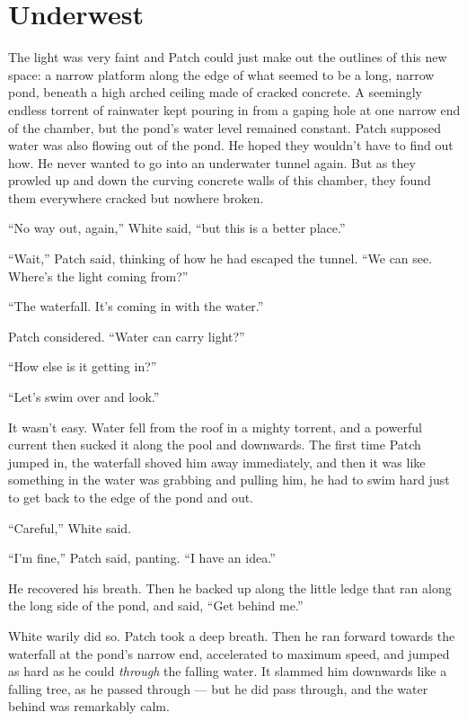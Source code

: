 \documentclass[12pt]{memoir}
\begin{document}

\section{Underwest}

The light was very faint and Patch could just make out the outlines of
this new space: a narrow platform along the edge of what seemed to be
a long, narrow pond, beneath a high arched ceiling made of cracked
concrete. A seemingly endless torrent of rainwater kept pouring in
from a gaping hole at one narrow end of the chamber, but the pond’s
water level remained constant. Patch supposed water was also flowing
out of the pond. He hoped they wouldn’t have to find out how. He never
wanted to go into an underwater tunnel again. But as they prowled up
and down the curving concrete walls of this chamber, they found them
everywhere cracked but nowhere broken.

“No way out, again,” White said, “but this is a better place.”

“Wait,” Patch said, thinking of how he had escaped the tunnel. “We can
see. Where’s the light coming from?”

“The waterfall. It’s coming in with the water.”

Patch considered. “Water can carry light?”

“How else is it getting in?”

“Let’s swim over and look.”

It wasn’t easy. Water fell from the roof in a mighty torrent, and a
powerful current then sucked it along the pool and downwards. The
first time Patch jumped in, the waterfall shoved him away immediately,
and then it was like something in the water was grabbing and pulling
him, he had to swim hard just to get back to the edge of the pond and
out.

“Careful,” White said.

“I’m fine,” Patch said, panting. “I have an idea.”

He recovered his breath. Then he backed up along the little ledge that
ran along the long side of the pond, and said, “Get behind me.”

White warily did so. Patch took a deep breath. Then he ran forward
towards the waterfall at the pond’s narrow end, accelerated to maximum
speed, and jumped as hard as he could \textit{through }the falling
water. It slammed him downwards like a falling tree, as he passed
through — but he did pass through, and the water behind was remarkably
calm.
\end{document}
